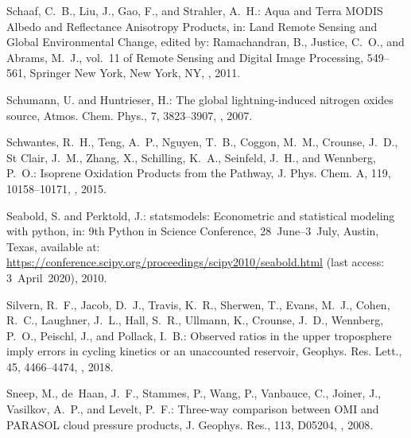 \documentclass[amt]{copernicus}
\begin{document}
\begin{thebibliography}{105}
Schaaf, C.~B., Liu, J., Gao, F., and Strahler, A.~H.: Aqua and Terra MODIS
  Albedo and Reflectance Anisotropy Products, in: Land Remote Sensing and
  Global Environmental Change, edited by: Ramachandran, B., Justice, C.~O., and
  Abrams, M.~J., vol.~11 of {Remote Sensing and Digital Image
  Processing},  549--561, {Springer New York}, New York, NY,
  , 2011.

Schumann, U. and Huntrieser, H.: The global lightning-induced nitrogen oxides source, Atmos. Chem. Phys., 7, 3823–3907, , 2007.

Schwantes, R.~H., Teng, A.~P., Nguyen, T.~B., Coggon, M.~M., Crounse, J.~D.,
  {St Clair}, J.~M., Zhang, X., Schilling, K.~A., Seinfeld, J.~H., and
  Wennberg, P.~O.: Isoprene  Oxidation Products from the  Pathway,
  J. Phys. Chem. A, 119, 10158--10171,
  , 2015.

Seabold, S. and Perktold, J.: statsmodels: Econometric and statistical modeling
  with python, in: 9th Python in Science Conference, 28~June--3~July,
Austin, Texas,
available at:
\url{https://conference.scipy.org/proceedings/scipy2010/seabold.html} (last access: 3~April~2020), 2010.

Silvern, R.~F., Jacob, D.~J., Travis, K.~R., Sherwen, T., Evans, M.~J., Cohen,
  R.~C., Laughner, J.~L., Hall, S.~R., Ullmann, K., Crounse, J.~D., Wennberg,
  P.~O., Peischl, J., and Pollack, I.~B.: Observed 
  ratios in the upper troposphere imply errors in
   cycling kinetics or an unaccounted
   reservoir, Geophys. Res. Lett.,
45, 4466--4474, , 2018.

Sneep, M., de~Haan, J.~F., Stammes, P., Wang, P., Vanbauce, C., Joiner, J.,
  Vasilkov, A.~P., and Levelt, P.~F.: Three-way comparison between OMI and
  PARASOL cloud pressure products, J. Geophys. Res., 113,
  D05204, , 2008.


\end{thebibliography}
\end{document}

